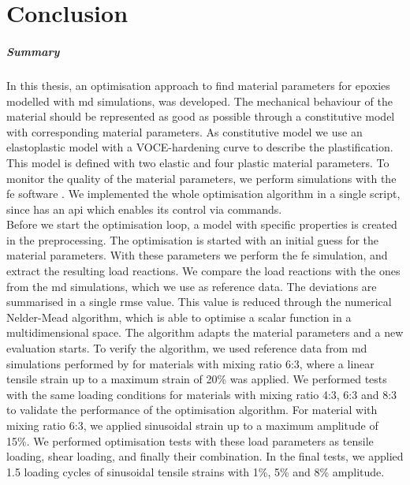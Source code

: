 \chapter{Conclusion}


\paragraph{Summary}
In this thesis, an optimisation approach to find material parameters for epoxies modelled with \acrshort{md} simulations, was developed. The mechanical behaviour of the material should be represented as good as possible through a constitutive model with corresponding material parameters. As constitutive model we use an elastoplastic model with a VOCE-hardening curve to describe the plastification. This model is defined with two elastic and four plastic material parameters. To monitor the quality of the material parameters, we perform simulations with the \acrshort{fe} software . We implemented the whole optimisation algorithm in a single  script, since  has an \acrlong{api} which enables its control via  commands. \\
Before we start the optimisation loop, a model with specific properties is created in the preprocessing. The optimisation is started with an initial guess for the material parameters. With these parameters we perform the \acrshort{fe} simulation, and extract the resulting load reactions.
We compare the load reactions with the ones from the \acrshort{md} simulations, which we use as reference data.
The deviations are summarised in a single \acrshort{rmse} value.
This value is reduced through the numerical Nelder-Mead algorithm, which is able to optimise a scalar function in a multidimensional space. 
The algorithm adapts the material parameters and a new evaluation starts. 
To verify the algorithm, we used reference data from \acrshort{md} simulations performed by \citet{ries_deciphering_nodate} for materials with mixing ratio 6:3, where a linear tensile strain up to a maximum strain of 20\% was applied.
We performed tests with the same loading conditions for materials with mixing ratio 4:3, 6:3 and 8:3 to validate the performance of the optimisation algorithm. 
For material with mixing ratio 6:3, we applied sinusoidal strain up to a maximum amplitude of 15\%. 
We performed optimisation tests with these load parameters as tensile loading, shear loading, and finally their combination. 
In the final tests, we applied 1.5 loading cycles of sinusoidal tensile strains with 1\%, 5\% and 8\% amplitude.

